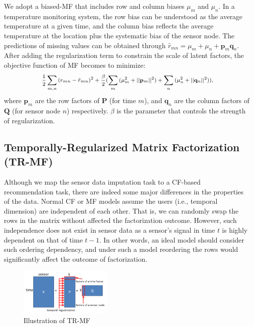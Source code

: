 We adopt a biased-MF that includes row and column biases $\mu_m$ and $\mu_n$. 
In a temperature monitoring system, the row bias can be understood as the average temperature at a given time, and the column bias reflects the average temperature at the location plus the systematic bias of the sensor node.
The predictions of missing values can be obtained through $\hat{r}_{mn} = \mu_m + \mu_n + \mathbf{p}_m \mathbf{q}_n$.
After adding the regularization term to constrain the scale of latent factors, the objective function of MF becomes to minimize:
\begin{equation*}\small \begin{aligned}
\frac{1}{2}\sum_{m,n}{(r_{mn} - \hat{r}_{mn})}^2
+ \frac{\beta}{2}(\sum_m{(\mu_m^2 + ||\mathbf{p}_m||^2)} + \sum_n{(\mu_n^2 + ||\mathbf{q}_n||^2)}),
\end{aligned}\end{equation*}
where $\mathbf{p}_m$ are the row factors of $\mathbf{P}$ (for time $m$), and $\mathbf{q}_n$ are the column factors of $\mathbf{Q}$ (for sensor node $n$) respectively.
$\beta$ is the parameter that controls the strength of regularization.

\subsection{Temporally-Regularized Matrix Factorization (TR-MF)}

Although we map the sensor data imputation task to a CF-based recommendation task, there are indeed some major differences in the properties of the data.
Normal CF or MF models assume the users (i.e., temporal dimension) are independent of each other. That is, we can randomly swap the rows in the matrix without affected the factorization outcome. However, such independence does not exist in sensor data as a 
sensor's signal in time $t$ is highly dependent on that of time $t-1$. In other words, an ideal model should consider such ordering dependency, and under such a model reordering the
rows would significantly affect the outcome of factorization.

\begin{figure}[htbp]
	\centering
	\includegraphics[width=0.4\textwidth]{TRMF_illustration.png}
        \vspace{-0.2in}
	\caption{\label{fig:tr-mf} Illustration of TR-MF}
\end{figure}

